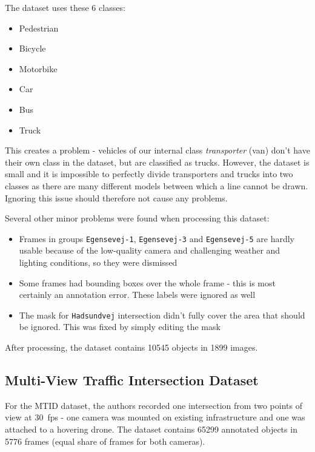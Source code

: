 The dataset uses these 6 classes:
\begin{itemize}
    \item Pedestrian
    \item Bicycle
    \item Motorbike
    \item Car
    \item Bus
    \item Truck
\end{itemize}
This creates a problem - vehicles of our internal class \textit{transporter}
(van) don't have their own class in the dataset, but are classified as trucks.
However, the dataset is small and it is impossible to perfectly divide
transporters and trucks into two classes as there are many different models
between which a line cannot be drawn.  Ignoring this issue should therefore not
cause any problems.

Several other minor problems were found when processing this dataset:
\begin{itemize}
    \item Frames in groups \verb|Egensevej-1|, \verb|Egensevej-3| and
    \verb|Egensevej-5| are hardly usable because of the low-quality camera and
    challenging weather and lighting conditions, so they were dismissed
    \item Some frames had bounding boxes over the whole frame - this is most
    certainly an annotation error. These labels were ignored as well
    \item The mask for \verb|Hadsundvej| intersection didn't fully cover the
    area that should be ignored. This was fixed by simply editing the mask
\end{itemize}

After processing, the dataset contains \num{10545} objects in \num{1899} images.


\subsection*{Multi-View Traffic Intersection Dataset}

For the MTID dataset, the authors \cite{Jensen2020} recorded one intersection
from two points of view at \SI{30}{fps} - one camera was mounted on existing
infrastructure and one was attached to a hovering drone. The dataset contains
\num{65299} annotated objects in \num{5776} frames (equal share of frames for
both cameras).


